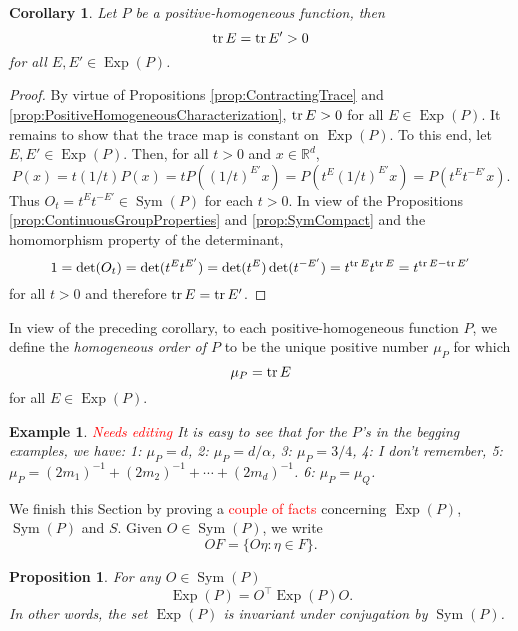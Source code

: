 \documentclass[11pt]{article}
\newtheorem{corollary}[theorem]{Corollary}
\newtheorem{proposition}[theorem]{Proposition}
\newtheorem{example}{Example}
\newcommand\Sym{\operatorname{Sym}}
\newcommand\Exp{\operatorname{Exp}}
\renewcommand\det{\operatorname{det}}
\begin{document}
\begin{corollary}\label{cor:TraceisInvariant}
Let $P$ be a positive-homogeneous function, then
\begin{equation*}
\tr E=\tr E'>0
\end{equation*}
for all $E,E'\in\Exp(P)$.
\end{corollary}
\begin{proof}
By virtue of Propositions \ref{prop:ContractingTrace} and \ref{prop:PositiveHomogeneousCharacterization}, $\tr E>0$ for all $E\in\Exp(P)$. It remains to show that the trace map is constant on $\Exp(P)$. To this end, let $E,E'\in\Exp(P)$. Then, for all $t>0$ and $x\in\mathbb{R}^d$,
\begin{equation*}
P(x)=t(1/t)P(x)=tP((1/t)^{E'}x)=P(t^E(1/t)^{E'}x)=P(t^{E}t^{-E'}x).
\end{equation*}
Thus $O_t=t^{E}t^{-E'}\in\Sym(P)$ for each $t>0$. In view of the Propositions \ref{prop:ContinuousGroupProperties} and \ref{prop:SymCompact} and the homomorphism property of the determinant,
\begin{equation*}
1=\det(O_t)=\det(t^{E}t^{E'})=\det(t^{E})\det(t^{-E'})=t^{\tr E}t^{\tr E}=t^{\tr E-\tr E'}
\end{equation*}
for all $t>0$ and therefore $\tr E=\tr E'$.
\end{proof}

\noindent In view of the preceding corollary, to each positive-homogeneous function $P$, we define the \textit{homogeneous order of $P$} to be the unique positive number $\mu_P$ for which
\begin{equation*}
\mu_P=\tr E
\end{equation*}
for all $E\in\Exp(P)$. 

\begin{example}\textcolor{red}{Needs editing}
It is easy to see that for the $P$'s in the begging examples, we have: 1: $\mu_P=d$, 2: $\mu_P=d/\alpha$, 3: $\mu_P=3/4$, 4: I don't remember, 5: $\mu_P=(2m_1)^{-1}+(2m_2)^{-1}+\cdots+(2m_d)^{-1}$. 6: $\mu_P=\mu_Q$.
\end{example}


We finish this Section by proving a \textcolor{red}{couple of facts} concerning $\Exp(P)$, $\Sym(P)$ and $S$. Given $O\in\Sym(P)$, we write
\begin{equation*}
    OF=\{O\eta:\eta\in F\}.
\end{equation*}

\begin{proposition}\label{prop:ExpP}
For any  $O \in \Sym{(P)} $
\begin{equation*}
    \Exp(P) = O^\top \Exp(P) O.
\end{equation*}
In other words, the set $\Exp(P)$ is invariant under conjugation by $\Sym(P)$.
\end{proposition}
\end{document}
